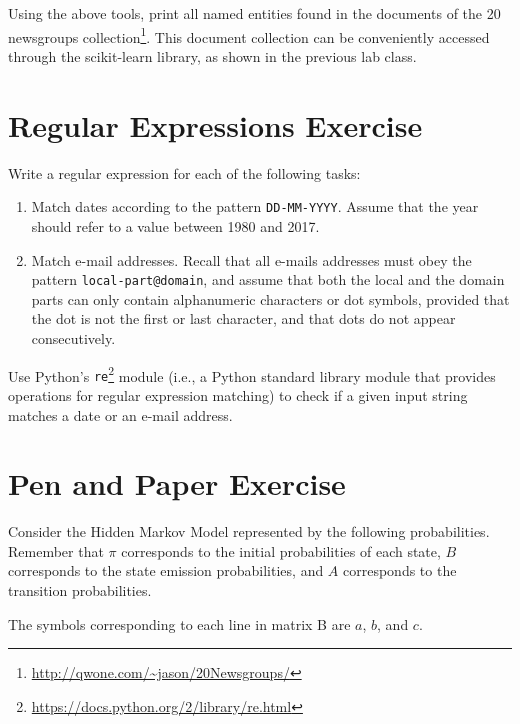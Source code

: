 \documentclass[12pt]{article}
\begin{document}
\section{}

Using the above tools, print all named entities found in the documents of the 20 newsgroups collection\footnote{ \url{http://qwone.com/~jason/20Newsgroups/}}. This document collection can be conveniently accessed through the scikit-learn library, as shown in the previous lab class.

\section{Regular Expressions Exercise}

Write a regular expression for each of the following tasks:

\begin{enumerate}
\item Match dates according to the pattern {\tt DD-MM-YYYY}. Assume that the year should refer to a value between 1980 and 2017.

\item Match e-mail addresses. Recall that all e-mails addresses must obey the pattern {\tt local-part@domain}, and assume that both the local and the domain parts can only contain alphanumeric characters or dot symbols, provided that the dot is not the first or last character, and that dots do not appear consecutively.
\end{enumerate}

Use Python's {\tt re}\footnote{\url{https://docs.python.org/2/library/re.html}} module (i.e., a Python standard library module that provides operations for regular expression matching) to check if a given input string matches a date or an e-mail address.

\section{Pen and Paper Exercise}

Consider the Hidden Markov Model represented by the following probabilities. Remember that $\pi$ corresponds to the initial probabilities of each state, $B$ corresponds to the state emission probabilities, and $A$ corresponds to the transition probabilities. 

The symbols corresponding to each line in matrix B are $a$, $b$, and $c$.
\end{document}
